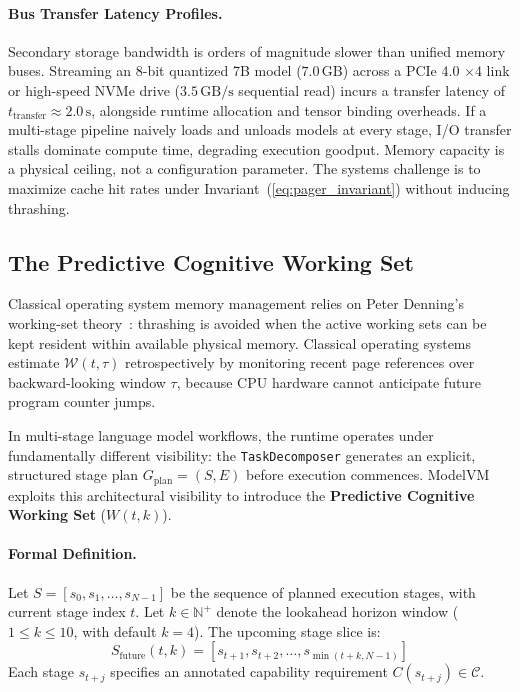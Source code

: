 \paragraph{Bus Transfer Latency Profiles.}
Secondary storage bandwidth is orders of magnitude slower than unified memory buses. Streaming an 8-bit quantized 7B model ($7.0\,\text{GB}$) across a PCIe 4.0 $\times 4$ link or high-speed NVMe drive ($3.5\,\text{GB/s}$ sequential read) incurs a transfer latency of $t_{\text{transfer}} \approx 2.0\,\text{s}$, alongside runtime allocation and tensor binding overheads. If a multi-stage pipeline naively loads and unloads models at every stage, I/O transfer stalls dominate compute time, degrading execution goodput. Memory capacity is a physical ceiling, not a configuration parameter. The systems challenge is to maximize cache hit rates under Invariant~(\ref{eq:pager_invariant}) without inducing thrashing.

\subsection{The Predictive Cognitive Working Set}
\label{sec:working_set_engine}

Classical operating system memory management relies on Peter Denning's working-set theory~\cite{denning1968working}: thrashing is avoided when the active working sets can be kept resident within available physical memory. Classical operating systems estimate $\mathcal{W}(t, \tau)$ retrospectively by monitoring recent page references over backward-looking window $\tau$, because CPU hardware cannot anticipate future program counter jumps.

In multi-stage language model workflows, the runtime operates under fundamentally different visibility: the \texttt{TaskDecomposer} generates an explicit, structured stage plan $G_{\text{plan}} = (S, E)$ before execution commences. ModelVM exploits this architectural visibility to introduce the \textbf{Predictive Cognitive Working Set} ($W(t, k)$).

\paragraph{Formal Definition.}
Let $S = [s_0, s_1, \dots, s_{N-1}]$ be the sequence of planned execution stages, with current stage index $t$. Let $k \in \mathbb{N}^+$ denote the lookahead horizon window ($1 \le k \le 10$, with default $k=4$). The upcoming stage slice is:
\begin{equation}
S_{\text{future}}(t, k) = [s_{t+1}, s_{t+2}, \dots, s_{\min(t+k, N-1)}]
\end{equation}
Each stage $s_{t+j}$ specifies an annotated capability requirement $C(s_{t+j}) \in \mathcal{C}$.

